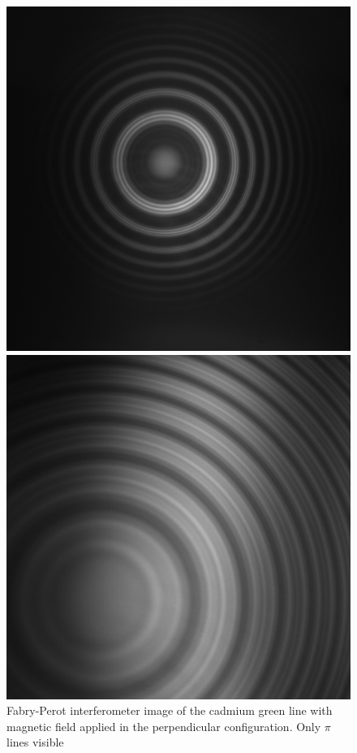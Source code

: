 \documentclass[11pt]{article}
\begin{document}
\begin{figure}[h!]
    \centering
    \begin{minipage}[t]{0.47\linewidth}
        \includegraphics[width=\linewidth]{mr pi green zeeman 2.png}
        \captionsetup{justification=centering}
        \caption{Fabry-Perot interferometer image of the cadmium green line with magnetic field applied in the perpendicular configuration. Only $\pi$ lines visible}
        \label{img: Cd green pi perp}
    \end{minipage}\hfill
    \begin{minipage}[t]{0.47\linewidth}
        \includegraphics[width=\linewidth]{hg green 9 lines cropped.jpeg}

\end{minipage}
\end{figure}
\end{document}
